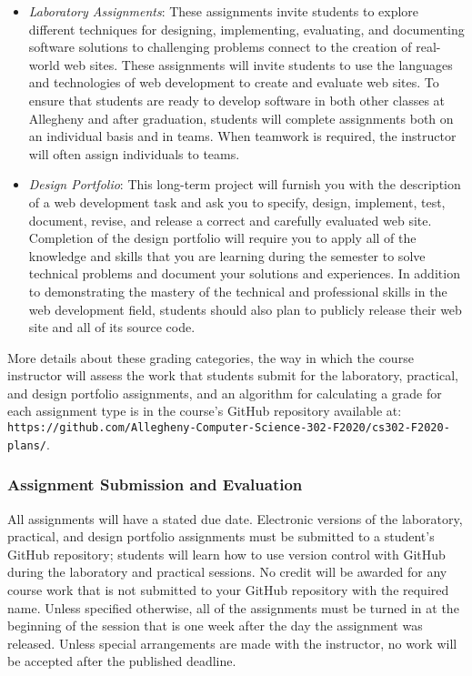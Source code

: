\documentclass[11pt]{article}
\newcommand{\url}[1]{\lstinline{#1}}
\begin{document}
\begin{itemize}
  \item {\em Laboratory Assignments\/}: These assignments invite students to
    explore different techniques for designing, implementing, evaluating, and
    documenting software solutions to challenging problems connect to the
    creation of real-world web sites. These assignments will invite students to
    use the languages and technologies of web development to create and evaluate
    web sites. To ensure that students are ready to develop software in both
    other classes at Allegheny and after graduation, students will complete
    assignments both on an individual basis and in teams. When teamwork is
    required, the instructor will often assign individuals to teams.

  \item {\em Design Portfolio\/}: This long-term project will furnish you with
    the description of a web development task and ask you to specify, design,
    implement, test, document, revise, and release a correct and carefully
    evaluated web site. Completion of the design portfolio will require you to
    apply all of the knowledge and skills that you are learning during the
    semester to solve technical problems and document your solutions and
    experiences. In addition to demonstrating the mastery of the technical and
    professional skills in the web development field, students should also plan
    to publicly release their web site and all of its source code.

\end{itemize}

\noindent More details about these grading categories, the way in which the
course instructor will assess the work that students submit for the laboratory,
practical, and design portfolio assignments, and an algorithm for calculating a
grade for each assignment type is in the course's GitHub repository available
at:
\url{https://github.com/Allegheny-Computer-Science-302-F2020/cs302-F2020-plans/}.

\subsubsection*{Assignment Submission and Evaluation}

All assignments will have a stated due date. Electronic versions of the
laboratory, practical, and design portfolio assignments must be submitted to a
student's GitHub repository; students will learn how to use version control with
GitHub during the laboratory and practical sessions. No credit will be awarded
for any course work that is not submitted to your GitHub repository with the
required name. Unless specified otherwise, all of the assignments must be turned
in at the beginning of the session that is one week after the day the assignment
was released. Unless special arrangements are made with the instructor, no work
will be accepted after the published deadline.
\end{document}
